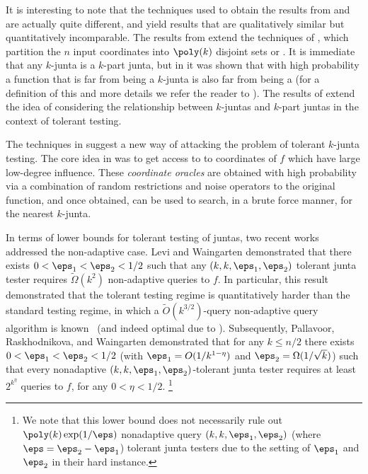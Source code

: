It is interesting to note that the techniques used to obtain the results from \cite{junta-submodular-opt} and \cite{junta-coordinate-oracles} are actually quite different, and yield results that are qualitatively similar but quantitatively incomparable. The results from \cite{junta-submodular-opt} extend the techniques of \cite{og-junta-testing}, which partition the $n$ input coordinates into $\poly(k)$ disjoint sets or . It is immediate that any $k$-junta is a $k$-part junta, but in \cite{og-junta-testing} it was shown that with high probability a function that is far from being a $k$-junta is also far from being a  (for a definition of this and more details we refer the reader to \cite{og-junta-testing}). 
The results of \cite{junta-submodular-opt} extend the idea of considering the relationship between $k$-juntas and $k$-part juntas in the context of tolerant testing. 

The techniques in \cite{junta-coordinate-oracles} suggest a new way of attacking the problem of tolerant $k$-junta testing. The core idea in \cite{junta-coordinate-oracles} was to get access to  to coordinates of $f$ which have large low-degree influence. These \emph{coordinate oracles} are obtained with high probability via a combination of random restrictions and noise operators to the original function, and once obtained, can be used to search, in a brute force manner, for the nearest $k$-junta. 

In terms of lower bounds for tolerant testing of juntas, two recent works addressed the non-adaptive case. Levi and Waingarten \cite{first-nonadaptive-junta-lbs} demonstrated that there exists $0<\eps_1<\eps_2<1/2$ such that any $(k, k, \eps_1,\eps_2)$ tolerant junta tester requires $\tilde{\Omega}(k^2)$ non-adaptive queries to $f$. In particular, this result demonstrated that the tolerant testing regime is quantitatively harder than the standard testing regime, in which a $\tilde{O}(k^{3/2})$-query non-adaptive query algorithm is known~\cite{ogg-testing-juntas} (and indeed optimal due to \cite{DBLP:journals/jacm/ChenSTWX18}). Subsequently, Pallavoor, Raskhodnikova, and Waingarten \cite{junta-lbs-PRW20} demonstrated that for any $k \le n/2$ there exists $0<\eps_1<\eps_2<1/2$ (with $\eps_1 = O(1/k^{1-\eta})$ and $\eps_2 = \Omega(1/\sqrt{k})$) such that every nonadaptive $(k, k, \eps_1,\eps_2)$-tolerant junta tester  requires at least $2^{k^\eta}$ queries to $f$, for any $0<\eta<1/2$.
\footnote{
We note that this lower bound does not necessarily rule out $\poly(k)\exp(1/\eps)$ nonadaptive query $(k, k, \eps_1, \eps_2)$ (where $\eps = \eps_2-\eps_1$) tolerant junta testers due to the setting of $\eps_1$ and $\eps_2$ in their hard instance.}










